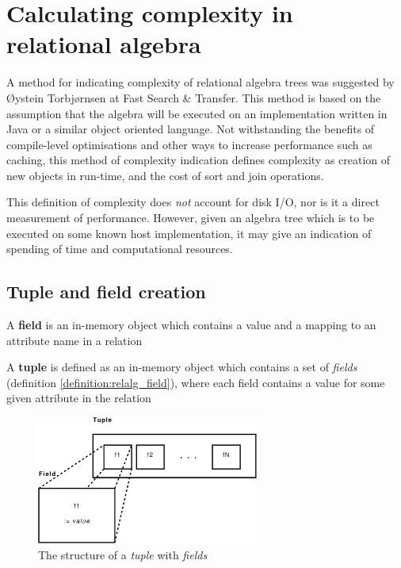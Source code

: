 \section{Calculating complexity in relational algebra}
\label{sect:method:complexity}
A method for indicating complexity of relational algebra trees was suggested
by \O ystein Torbj\o rnsen at Fast Search \& Transfer. This method is based on the assumption
that the algebra will be executed on an implementation written in Java or a
similar object oriented language. Not withstanding the
benefits of compile-level optimisations and other ways to increase performance
such as caching, this method of complexity indication defines complexity as
creation of new objects in run-time, and the cost of sort and join operations.

This definition of complexity does \textit{not} account
for disk I/O, nor is it a direct measurement of performance. However, given
an algebra tree which is to be executed on some known host implementation, it
may give an indication of spending of time and computational resources.

\subsection{Tuple and field creation}

\begin{myDefinition}
A \textbf{field} is an in-memory object which contains a value and a mapping to
an attribute name in a relation
\label{definition:relalg_field}
\end{myDefinition}

\begin{myDefinition}
A \textbf{tuple} is defined as an in-memory object which contains a set of
\textit{fields} (definition \ref{definition:relalg_field}), where each field
contains a value for some given attribute in the relation
\label{definition:relalg_tuple}
\end{myDefinition}

\begin{figure}[!htp]
\begin{center}
  \includegraphics[width=0.65\textwidth]{diagrams/tuple_post}
  \caption[Tuple/Field structure]{The structure of a \textit{tuple} with
  \textit{fields}}
  \label{fig:method:tuple_field}
\end{center}
\end{figure}

